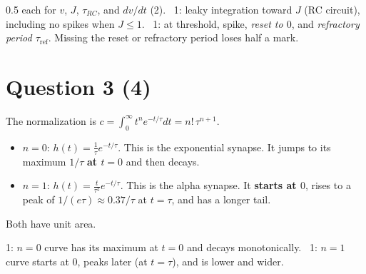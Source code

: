 \documentclass[11pt,letterpaper]{article}
\newcommand{\tref}{\tau_{\mathrm{ref}}}
\newcommand{\trc}{\tau_{RC}}
\newcommand{\ans}[1]{\par\vspace{4pt}{\bfseries #1}\quad}
\begin{document}
\begin{marking}
0.5 each for $v$, $J$, $\trc$, and $dv/dt$ (2). \ 1: leaky integration toward $J$ (RC circuit), including no spikes when $J \le 1$. \ 1: at threshold, spike, \emph{reset to $0$}, and \emph{refractory period $\tref$}. Missing the reset or refractory period loses half a mark.
\end{marking}

\section*{Question 3 \hfill (4)}

\ans{(a) [2]}
The normalization is $c = \int_0^\infty t^n e^{-t/\tau}dt = n!\,\tau^{n+1}$.
\begin{itemize}[leftmargin=1.2em]
\item $n = 0$: $h(t) = \frac1\tau e^{-t/\tau}$. This is the exponential synapse. It jumps to its maximum $1/\tau$ \textbf{at $t = 0$} and then decays.
\item $n = 1$: $h(t) = \frac{t}{\tau^2}e^{-t/\tau}$. This is the alpha synapse. It \textbf{starts at $0$}, rises to a peak of $1/(e\tau) \approx 0.37/\tau$ at $t = \tau$, and has a longer tail.
\end{itemize}
Both have unit area.
\begin{center}
\end{center}
\begin{marking}
1: $n = 0$ curve has its maximum at $t = 0$ and decays monotonically. \ 1: $n = 1$ curve starts at $0$, peaks later (at $t = \tau$), and is lower and wider.
\end{marking}
\end{document}
